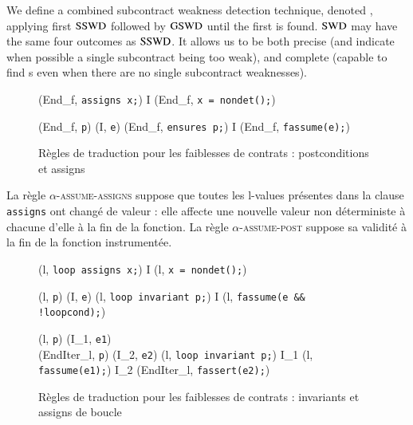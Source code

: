 We define a combined subcontract weakness detection technique, denoted \SWD, applying
first $\mathrm{SSWD}$ followed by  $\mathrm{GSWD}$ until the first \SWCE is found. 
$\mathrm{SWD}$ may have the same four outcomes as  $\mathrm{SSWD}$.
It allows us
to be both precise (and indicate when possible a single subcontract being too weak),
and complete (capable to find \GSWCE{}s even when there are no single subcontract weaknesses).




\begin{figure}[bt]
  \scriptsize{
    {
      {}
      {(End_f, \mbox{\lstinline'assigns x;'})
        I \concat (End_f, \mbox{\lstinline'x = nondet();'})}{}
    }

    {
      {(End_f, \mbox{\lstinline'p'})  (I, \mbox{\lstinline'e'})}
      {(End_f, \mbox{\lstinline'ensures p;'})
        I \concat (End_f, \mbox{\lstinline'fassume(e);'})}{}
    }
  }
  \caption{Règles de traduction pour les faiblesses de contrats :
    postconditions et assigns}
  \label{fig:assume-annot}
\end{figure}

La règle \textsc{$\alpha$-assume-assigns} suppose que toutes les l-values
présentes dans la clause \lstinline'assigns' ont changé de valeur : elle affecte
une nouvelle valeur non déterministe à chacune d'elle à la fin de la fonction.
La règle \textsc{$\alpha$-assume-post} suppose sa validité à la fin de la
fonction instrumentée.

\begin{figure}[bt]
  \scriptsize{
    {
      {}
      {(l, \mbox{\lstinline'loop assigns x;'})
        I \concat (l, \mbox{\lstinline'x = nondet();'})}{}
    }

    {
      {(l, \mbox{\lstinline'p'})  (I, \mbox{\lstinline'e'})}
      {
        (l, \mbox{\lstinline'loop invariant p;'}) 
        I \concat (l, \mbox{\lstinline'fassume(e && !loopcond);'})
      }{}
    }

    {
      {(l, \mbox{\lstinline'p'})  (I_1, \mbox{\lstinline'e1'}) \\
        (EndIter_l, \mbox{\lstinline'p'}) 
        (I_2, \mbox{\lstinline'e2'})}
      {
        (l, \mbox{\lstinline'loop invariant p;'}) 
        I_1 \concat (l, \mbox{\lstinline'fassume(e1);'})
        \concat I_2 \concat (EndIter_l, \mbox{\lstinline'fassert(e2);'})
      }{}
    }
  }
  \caption{Règles de traduction pour les faiblesses de contrats :
    invariants et assigns de boucle}
  \label{fig:assume-loop-annot}
\end{figure}

